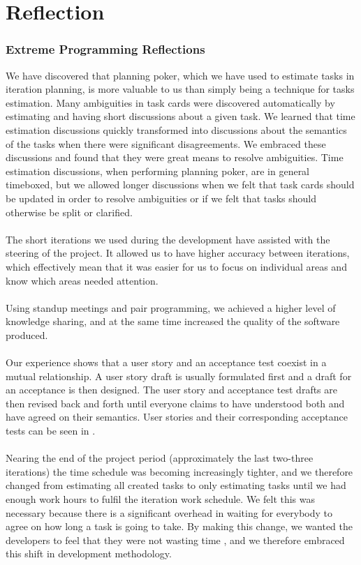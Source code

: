 
\chapter{Reflection}
\label{cha:reflection}

\subsection{Extreme Programming Reflections}
We have discovered that planning poker, which we have used to estimate tasks in iteration planning, is more valuable to us than simply being a technique for tasks estimation. Many ambiguities in task cards were discovered automatically by estimating and having short discussions about a given task. We learned that time estimation discussions quickly transformed into discussions about the semantics of the tasks when there were significant disagreements. We embraced these discussions and found that they were great means to resolve ambiguities. Time estimation discussions, when performing planning poker, are in general timeboxed, but we allowed longer discussions when we felt that task cards should be updated in order to resolve ambiguities or if we felt that tasks should otherwise be split or clarified.
\\\\
The short iterations we used during the development have assisted with the steering of the project. It allowed us to have higher accuracy between iterations, which effectively mean that it was easier for us to focus on individual areas and know which areas needed attention. 
\\\\
Using standup meetings and pair programming, we achieved a higher level of knowledge sharing, and at the same time increased the quality of the software produced. 
\\\\
Our experience shows that a user story and an acceptance test coexist in a mutual relationship. A user story draft is usually formulated first and a draft for an acceptance is then designed. The user story and acceptance test drafts are then revised back and forth until everyone claims to have understood both and have agreed on their semantics. User stories and their corresponding acceptance tests can be seen in .
\\\\
Nearing the end of the project period (approximately the last two-three iterations) the time schedule was becoming increasingly tighter, and we therefore changed from estimating all created tasks to only estimating tasks until we had enough work hours to fulfil the iteration work schedule. We felt this was necessary because there is a significant overhead in waiting for everybody to agree on how long a task is going to take. By making this change, we wanted the developers to feel that they were not wasting time , and we therefore embraced this shift in development methodology.

